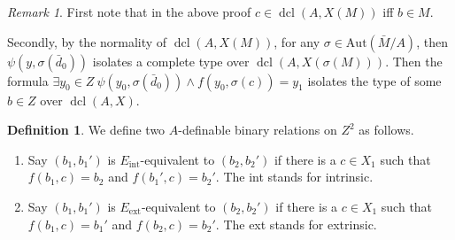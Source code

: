 \documentclass{amsart}
\theoremstyle{definition}
\newtheorem{definition}[theorem]{Definition}
\theoremstyle{remark}
\newtheorem{remark}[theorem]{Remark}
\numberwithin{equation}{section}
\def \aut {\text{Aut}}
\def \dcl {\operatorname{dcl}}
\begin{document}
\begin{remark}\label{rmk: fund in M}
    First note that in the above proof $c \in \dcl(A,X(M))$ iff $b \in M$. 
    
    Secondly, by the normality of $\dcl(A,X(M))$, for any $\sigma \in \aut(\bar{M}/A)$, then $\psi(y,\sigma(\bar{d}_0))$ isolates a complete type over $\dcl(A,X(\sigma(M)))$. Then the formula $\exists y_0 \in Z \  \psi(y_0,\sigma(\bar{d}_0)) \wedge f(y_0,\sigma(c))= y_1$ isolates the type of some $b \in Z$ over $\dcl(A,X)$.    
\end{remark}

\begin{definition}
We define two $A$-definable binary relations on $Z^2$ as follows. \begin{enumerate}
    \item Say $(b_1,b_1')$ is $E_{\text{int}}$-equivalent to $(b_2,b_2')$ if there is a $c \in X_1$ such that $f(b_1,c) = b_2$ and $f(b_1',c) = b_2'$. The int stands for intrinsic. 
    \item Say $(b_1,b_1')$ is $E_{\text{ext}}$-equivalent to $(b_2,b_2')$ if there is a $c \in X_1$ such that $f(b_1,c) = b_1'$ and $f(b_2,c) = b_2'$. The ext stands for extrinsic. 
\end{enumerate} 
\end{definition}
\end{document}
